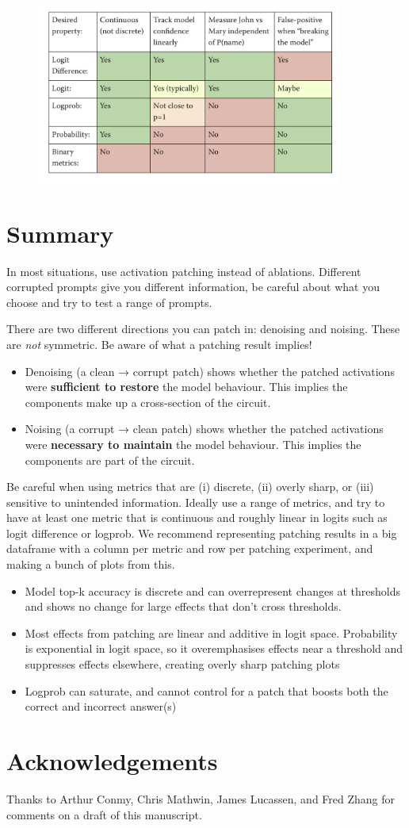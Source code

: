 \documentclass[nonatbib]{article}
\begin{document}
\begin{figure}[H]
    \centering
    \includegraphics[width=0.9\textwidth]{Screenshot.png}
\end{figure}

\section{Summary}
In most situations, use activation patching instead of ablations. Different corrupted prompts give you different information, be careful about what you choose and try to test a range of prompts.

There are two different directions you can patch in: denoising and noising. These are \textit{not} symmetric. Be aware of what a patching result implies!
\begin{itemize}
    \item Denoising (a clean → corrupt patch) shows whether the patched activations were \textbf{sufficient to restore} the model behaviour. This implies the components make up a cross-section of the circuit.
    \item Noising (a corrupt → clean patch) shows whether the patched activations were \textbf{necessary to maintain} the model behaviour. This implies the components are part of the circuit.
\end{itemize}

Be careful when using metrics that are (i) discrete, (ii) overly sharp, or (iii) sensitive to unintended information. Ideally use a range of metrics, and try to have at least one metric that is continuous and roughly linear in logits such as logit difference or logprob. We recommend representing patching results in a big dataframe with a column per metric and row per patching experiment, and making a bunch of plots from this.
\begin{itemize}
    \item Model top-k accuracy is discrete and can overrepresent changes at thresholds and shows no change for large effects that don't cross thresholds.
    \item Most effects from patching are linear and additive in logit space. Probability is exponential in logit space, so it overemphasises effects near a threshold and suppresses effects elsewhere, creating overly sharp patching plots
    \item Logprob can saturate, and cannot control for a patch that boosts both the correct and incorrect answer(s)
\end{itemize}

\section*{Acknowledgements}
Thanks to Arthur Conmy, Chris Mathwin, James Lucassen, and Fred Zhang for comments on a draft of this manuscript.

\printbibliography
\end{document}
